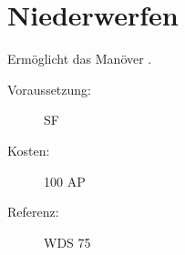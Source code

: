 \section{Niederwerfen}
\label{sf.niederwerfen}
Ermöglicht das Manöver .
\begin{description}
    \item[Voraussetzung:]
        SF 
    \item [Kosten:]
        100 AP
    \item [Referenz:]
        WDS 75
\end{description}

